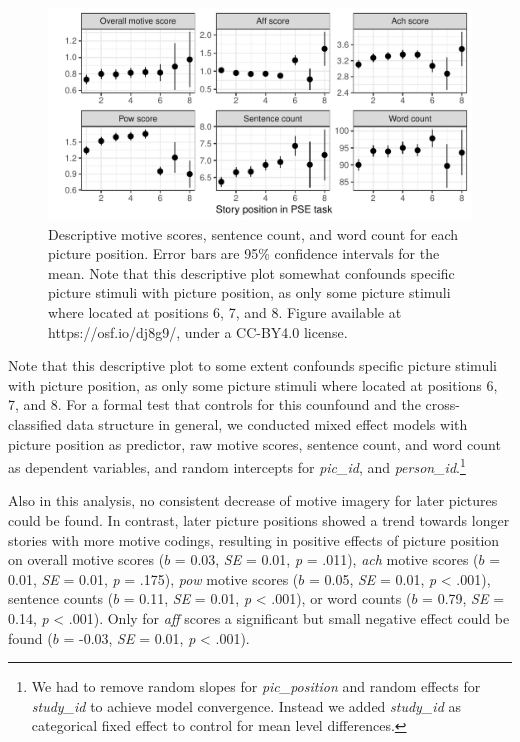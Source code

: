 \documentclass[man,a4paper,mask]{apa6}\usepackage[]{graphicx}\usepackage[]{color}
\newenvironment{knitrout}{}{} %
\begin{document}
\begin{knitrout}
\color{fgcolor}\begin{figure}

{\centering \includegraphics[width=.9\textwidth]{figure/picPosPlot-1} 

}

\caption[Descriptive motive scores, sentence count, and word count for each picture position]{Descriptive motive scores, sentence count, and word count for each picture position. Error bars are 95\% confidence intervals for the mean. Note that this descriptive plot somewhat confounds specific picture stimuli with picture position, as only some picture stimuli where located at positions 6, 7, and 8. Figure available at https://osf.io/dj8g9/, under a CC-BY4.0 license.}\label{fig:picPosPlot}
\end{figure}


\end{knitrout}

Note that this descriptive plot to some extent confounds specific picture stimuli with picture position, as only some picture stimuli where located at positions 6, 7, and 8. For a formal test that controls for this counfound and the cross-classified data structure in general, we conducted mixed effect models with picture position as predictor, raw motive scores, sentence count, and word count as dependent variables, and random intercepts for \emph{pic\_id}, and \emph{person\_id}.\footnote{We had to remove random slopes for \emph{pic\_position} and random effects for \emph{study\_id} to achieve model convergence. Instead we added \emph{study\_id} as categorical fixed effect to control for mean level differences.} 

Also in this analysis, no consistent decrease of motive imagery for later pictures could be found. In contrast, later picture positions showed a trend towards longer stories with more motive codings, resulting in positive effects of picture position on overall motive scores ($b$ = 0.03, \emph{SE} = 0.01, \emph{p} = .011), \emph{ach} motive scores ($b$ = 0.01, \emph{SE} = 0.01, \emph{p} = .175), \emph{pow} motive scores ($b$ = 0.05, \emph{SE} = 0.01, \emph{p} < .001), sentence counts ($b$ = 0.11, \emph{SE} = 0.01, \emph{p} < .001), or word counts ($b$ = 0.79, \emph{SE} = 0.14, \emph{p} < .001). Only for \emph{aff} scores a significant but small negative effect could be found ($b$ = -0.03, \emph{SE} = 0.01, \emph{p} < .001).
\end{document}

